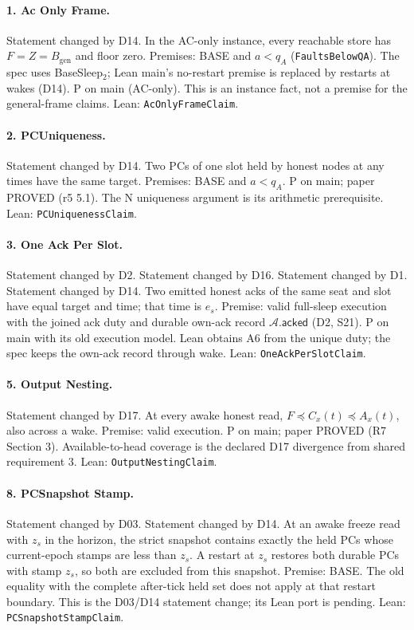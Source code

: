 \documentclass{article}
\newcommand{\genesis}{B_{\mathrm{gen}}}
\newcommand{\AC}{\mathcal A}
\newcommand{\acked}{\mathsf{acked}}
\newcommand{\nm}[1]{\nolinkurl{#1}}
\begin{document}
\paragraph{1. Ac Only Frame.}
Statement changed by D14.
In the AC-only instance, every reachable store has $F=Z=\genesis$ and floor zero. Premises: BASE and $a<q_A$ (\nm{FaultsBelowQA}). The spec uses BaseSleep$_2$; Lean main's no-restart premise is replaced by restarts at wakes (D14). P on main (AC-only). This is an instance fact, not a premise for the general-frame claims.
Lean: \nm{AcOnlyFrameClaim}.

\paragraph{2. PCUniqueness.}
Statement changed by D14.
Two PCs of one slot held by honest nodes at any times have the same target. Premises: BASE and $a<q_A$. P on main; paper PROVED (r5 5.1). The N uniqueness argument is its arithmetic prerequisite.
Lean: \nm{PCUniquenessClaim}.

\paragraph{3. One Ack Per Slot.}
Statement changed by D2. Statement changed by D16.
Statement changed by D1. Statement changed by D14.
Two emitted honest acks of the same seat and slot have equal target and time; that time is $e_s$. Premise: valid full-sleep execution with the joined ack duty and durable own-ack record $\AC.\acked$ (D2, S21). P on main with its old execution model. Lean obtains A6 from the unique duty; the spec keeps the own-ack record through wake.
Lean: \nm{OneAckPerSlotClaim}.

\paragraph{5. Output Nesting.}
Statement changed by D17.
At every awake honest read, $F\preceq C_x(t)\preceq A_x(t)$, also across a wake. Premise: valid execution. P on main; paper PROVED (R7 Section 3). Available-to-head coverage is the declared D17 divergence from shared requirement 3.
Lean: \nm{OutputNestingClaim}.

\paragraph{8. PCSnapshot Stamp.}
Statement changed by D03. Statement changed by D14.
At an awake freeze read with $z_s$ in the horizon, the strict snapshot contains exactly the held PCs whose current-epoch stamps are less than $z_s$. A restart at $z_s$ restores both durable PCs with stamp $z_s$, so both are excluded from this snapshot. Premise: BASE. The old equality with the complete after-tick held set does not apply at that restart boundary. This is the D03/D14 statement change; its Lean port is pending.
Lean: \nm{PCSnapshotStampClaim}.
\end{document}
